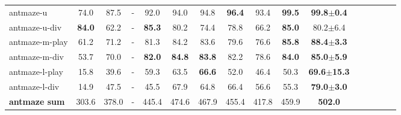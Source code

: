 \begin{table*}[h!]
{\begin{tabular}{lccccccccccccccc}
\midrule
antmaze-u & 74.0 & 87.5 & - & 92.0 & 94.0 & 94.8 & \textbf{96.4} & 93.4 & \textbf{99.5} & \textbf{99.8$\pm$0.4} \\ 
antmaze-u-div & \textbf{84.0} & 62.2 & - & \textbf{85.3} & 80.2 & 74.4 & 78.8 & 66.2 & \textbf{85.0} & 80.2$\pm$6.4\\ 
antmaze-m-play & 61.2 & 71.2 & - & 81.3 & 84.2 & 83.6 & 79.6 & 
76.6 & \textbf{85.8} & \textbf{88.4$\pm$3.3}\\ 
antmaze-m-div & 53.7 & 70.0 & - & \textbf{82.0} & \textbf{84.8} & \textbf{83.8} & 82.2 & 78.6 &\textbf{84.0} & \textbf{85.0$\pm$5.9}\\ 
antmaze-l-play & 15.8 & 39.6 & - & 59.3 & 63.5 & \textbf{66.6} & 52.0 & 46.4 &50.3 & \textbf{69.6$\pm$15.3}\\ 
antmaze-l-div & 14.9 & 47.5 & - & 45.5 & 67.9 & 64.8 & 66.4 & 56.6 & 55.3 &\textbf{79.0$\pm$3.0}\\ 
\midrule
\textbf{antmaze sum} & 303.6 & 378.0 & - & 445.4 & 474.6  & 467.9 & 455.4 & 417.8 &459.9 & \textbf{502.0}\\ 
\bottomrule
\end{tabular}
}
\end{table*}
